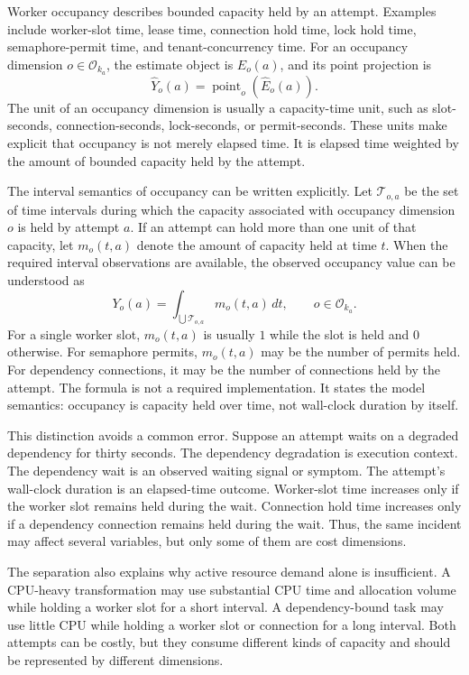 Worker occupancy describes bounded capacity held by an attempt. Examples
include worker-slot time, lease time, connection hold time, lock hold time,
semaphore-permit time, and tenant-concurrency time. For an occupancy dimension
$o \in \mathcal{O}_{k_a}$, the estimate object is $\widehat{E}_o(a)$, and its
point projection is
\[
\widehat{Y}_o(a)
=
\operatorname{point}_o\!\left(\widehat{E}_o(a)\right).
\]
The unit of an occupancy dimension is usually a capacity-time unit, such as
slot-seconds, connection-seconds, lock-seconds, or permit-seconds. These units
make explicit that occupancy is not merely elapsed time. It is elapsed time
weighted by the amount of bounded capacity held by the attempt.

The interval semantics of occupancy can be written explicitly. Let
$\mathcal{T}_{o,a}$ be the set of time intervals during which the capacity
associated with occupancy dimension $o$ is held by attempt $a$. If an attempt
can hold more than one unit of that capacity, let $m_o(t,a)$ denote the amount
of capacity held at time $t$. When the required interval observations are
available, the observed occupancy value can be understood as
\[
Y_o(a)
=
\int_{\bigcup \mathcal{T}_{o,a}}
m_o(t,a)\,dt,
\qquad
o \in \mathcal{O}_{k_a}.
\]
For a single worker slot, $m_o(t,a)$ is usually $1$ while the slot is held and
$0$ otherwise. For semaphore permits, $m_o(t,a)$ may be the number of permits
held. For dependency connections, it may be the number of connections held by
the attempt. The formula is not a required implementation. It states the model
semantics: occupancy is capacity held over time, not wall-clock duration by
itself.

This distinction avoids a common error. Suppose an attempt waits on a degraded
dependency for thirty seconds. The dependency degradation is execution context.
The dependency wait is an observed waiting signal or symptom. The attempt's
wall-clock duration is an elapsed-time outcome. Worker-slot time increases only
if the worker slot remains held during the wait. Connection hold time increases
only if a dependency connection remains held during the wait. Thus, the same
incident may affect several variables, but only some of them are cost
dimensions.

The separation also explains why active resource demand alone is insufficient.
A CPU-heavy transformation may use substantial CPU time and allocation volume
while holding a worker slot for a short interval. A dependency-bound task may
use little CPU while holding a worker slot or connection for a long interval.
Both attempts can be costly, but they consume different kinds of capacity and
should be represented by different dimensions.

